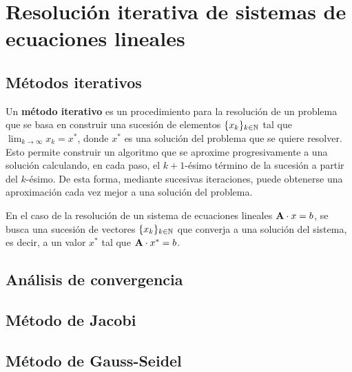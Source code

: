 
\section{Resolución iterativa de sistemas de ecuaciones lineales}
\label{section:metodos-iterativos}

\subsection{Métodos iterativos}
Un \textbf{método iterativo} es un procedimiento para la resolución de un
problema que se basa en construir una sucesión de elementos $\lbrace x_k
\rbrace_{k \in \mathbb{N}}$ tal que $\lim_{k\to\infty} x_k = x^\ast$, donde $x^\ast$
es una solución del problema que se quiere resolver.
Esto permite construir un algoritmo que se aproxime progresivamente a una
solución calculando, en cada paso, el $k+1$-ésimo término de la sucesión a
partir del $k$-ésimo. De esta forma, mediante sucesivas iteraciones, puede
obtenerse una aproximación cada vez mejor a una solución del problema.

En el caso de la resolución de un sistema de ecuaciones lineales $\mathbf{A}
\cdot x = b$, se busca una sucesión de vectores $\lbrace x_k \rbrace_{k \in
\mathbb{N}}$ que converja a una solución del sistema, es decir, a un valor $x^\ast$
tal que $\mathbf{A} \cdot x^\ast = b$.

\subsection{Análisis de convergencia}

\subsection{Método de Jacobi}

\subsection{Método de Gauss-Seidel}
